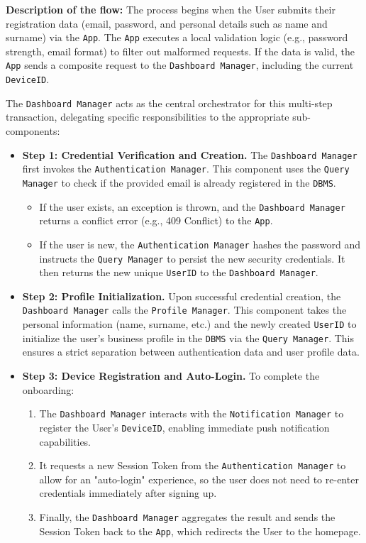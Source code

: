 \textbf{Description of the flow:}
The process begins when the User submits their registration data (email, password, and personal details such as name and surname) via the \texttt{App}. The \texttt{App} executes a local validation logic (e.g., password strength, email format) to filter out malformed requests. If the data is valid, the \texttt{App} sends a composite request to the \texttt{Dashboard Manager}, including the current \texttt{DeviceID}.

The \texttt{Dashboard Manager} acts as the central orchestrator for this multi-step transaction, delegating specific responsibilities to the appropriate sub-components:

\begin{itemize}
    \item \textbf{Step 1: Credential Verification and Creation.} The \texttt{Dashboard Manager} first invokes the \texttt{Authentication Manager}. This component uses the \texttt{Query Manager} to check if the provided email is already registered in the \texttt{DBMS}.
    \begin{itemize}
        \item If the user exists, an exception is thrown, and the \texttt{Dashboard Manager} returns a conflict error (e.g., 409 Conflict) to the \texttt{App}.
        \item If the user is new, the \texttt{Authentication Manager} hashes the password and instructs the \texttt{Query Manager} to persist the new security credentials. It then returns the new unique \texttt{UserID} to the \texttt{Dashboard Manager}.
    \end{itemize}
    
    \item \textbf{Step 2: Profile Initialization.} Upon successful credential creation, the \texttt{Dashboard Manager} calls the \texttt{Profile Manager}. This component takes the personal information (name, surname, etc.) and the newly created \texttt{UserID} to initialize the user's business profile in the \texttt{DBMS} via the \texttt{Query Manager}. This ensures a strict separation between authentication data and user profile data.

    \item \textbf{Step 3: Device Registration and Auto-Login.} To complete the onboarding:
    \begin{enumerate}
        \item The \texttt{Dashboard Manager} interacts with the \texttt{Notification Manager} to register the User's \texttt{DeviceID}, enabling immediate push notification capabilities.
        \item It requests a new Session Token from the \texttt{Authentication Manager} to allow for an "auto-login" experience, so the user does not need to re-enter credentials immediately after signing up.
        \item Finally, the \texttt{Dashboard Manager} aggregates the result and sends the Session Token back to the \texttt{App}, which redirects the User to the homepage.
    \end{enumerate}
\end{itemize}


